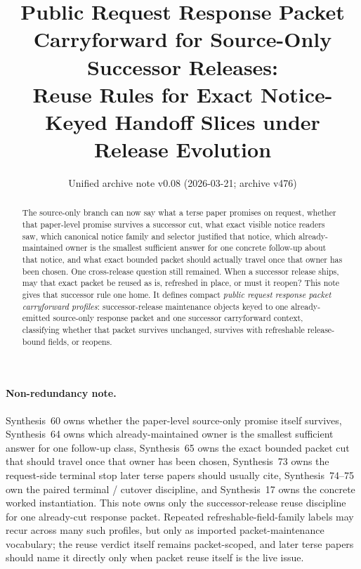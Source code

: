 \documentclass[11pt]{article}
\title{Public Request Response Packet Carryforward for Source-Only Successor Releases:\\[0.5ex]
\large Reuse Rules for Exact Notice-Keyed Handoff Slices under Release Evolution}
\author{}
\date{Unified archive note v0.08 (2026-03-21; archive v476)}
\begin{document}
\maketitle

\begin{abstract}
The source-only branch can now say what a terse paper promises on request, whether that paper-level promise survives a successor cut, what exact visible notice readers saw, which canonical notice family and selector justified that notice, which already-maintained owner is the smallest sufficient answer for one concrete follow-up about that notice, and what exact bounded packet should actually travel once that owner has been chosen.
One cross-release question still remained.
When a successor release ships, may that exact packet be reused as is, refreshed in place, or must it reopen?
This note gives that successor rule one home.
It defines compact \emph{public request response packet carryforward profiles}: successor-release maintenance objects keyed to one already-emitted source-only response packet and one successor carryforward context, classifying whether that packet survives unchanged, survives with refreshable release-bound fields, or reopens.
\end{abstract}

\paragraph{Non-redundancy note.}
Synthesis~60 owns whether the paper-level source-only promise itself survives, Synthesis~64 owns which already-maintained owner is the smallest sufficient answer for one follow-up class, Synthesis~65 owns the exact bounded packet cut that should travel once that owner has been chosen, Synthesis~73 owns the request-side terminal stop later terse papers should usually cite, Synthesis~74--75 own the paired terminal / cutover discipline, and Synthesis~17 owns the concrete worked instantiation.\cite{series:publicrequestcarryforward,series:publicrequestresponsemenus,series:publicrequestresponsepackets,series:publicrequestresponsepacketrefreshresponsepacketclosureverdicts,series:pairedterminalcitationdiscipline,series:pairedterminalcutoverrule,series:workedexample}
This note owns only the successor-release reuse discipline for one already-cut response packet. Repeated refreshable-field-family labels may recur across many such profiles, but only as imported packet-maintenance vocabulary; the reuse verdict itself remains packet-scoped, and later terse papers should name it directly only when packet reuse itself is the live issue.
\end{document}
